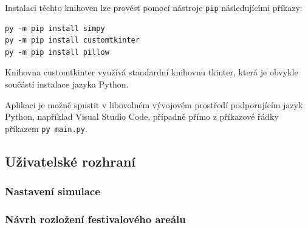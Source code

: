 \documentclass[
  program=itp,
  biblatex,
  figures=false,
  glossaries,
  index
]{kidiplom}
\begin{document}
Instalaci těchto knihoven lze provést pomocí nástroje \texttt{pip} následujícími příkazy:

\begin{verbatim}
py -m pip install simpy
py -m pip install customtkinter
py -m pip install pillow
\end{verbatim}

Knihovna customtkinter využívá standardní knihovnu tkinter, která je obvykle součástí instalace jazyka Python.

Aplikaci je možné spustit v libovolném vývojovém prostředí podporujícím jazyk Python, například Visual Studio Code, případně přímo z příkazové řádky příkazem \texttt{py main.py}.

\subsection{Uživatelské rozhraní}
\subsubsection{Nastavení simulace}
\subsubsection{Návrh rozložení festivalového areálu}















































\newcommand{\BibLaTeX}{\textsc{Bib}\LaTeX}

\end{document}
